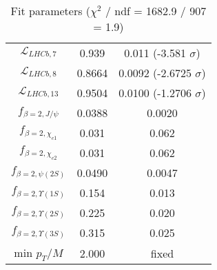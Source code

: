 \begin{table}[h!]
\begin{tabular}{c|c|c}
$\mathcal L_{LHCb,7}$ & 0.939 & 0.011 (-3.581 $\sigma$) \\
$\mathcal L_{LHCb,8}$ & 0.8664 & 0.0092 (-2.6725 $\sigma$) \\
$\mathcal L_{LHCb,13}$ & 0.9504 & 0.0100 (-1.2706 $\sigma$) \\
$f_{\beta=2,J/\psi}$ & 0.0388 & 0.0020 \\
$f_{\beta=2,\chi_{c1}}$ & 0.031 & 0.062 \\
$f_{\beta=2,\chi_{c2}}$ & 0.031 & 0.062 \\
$f_{\beta=2,\psi(2S)}$ & 0.0490 & 0.0047 \\
$f_{\beta=2,\Upsilon(1S)}$ & 0.154 & 0.013 \\
$f_{\beta=2,\Upsilon(2S)}$ & 0.225 & 0.020 \\
$f_{\beta=2,\Upsilon(3S)}$ & 0.315 & 0.025 \\
min $p_T/M$ & 2.000 & fixed \\
\end{tabular}
\caption{Fit parameters ($\chi^2$ / ndf = 1682.9 / 907 = 1.9)}
\end{table}
